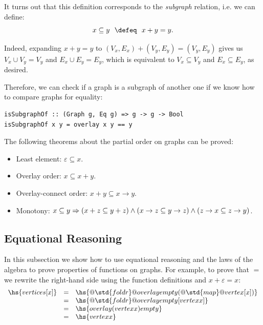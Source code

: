 \noindent
It turns out that this definition corresponds to the \emph{subgraph} relation,
i.e. we can define:
\[
x \subseteq y~~\defeq~~x + y = y.
\]

\noindent
Indeed, expanding $x + y = y$ to $(V_x,E_x) + (V_y,E_y) = (V_y,E_y)$ gives us
$V_x \cup V_y = V_y$ and $E_x \cup E_y = E_y$, which is equivalent to
$V_x \subseteq V_y$ and $E_x \subseteq E_y$, as desired.

Therefore, we can check if a graph is a subgraph of another one if we know how to
compare graphs for equality:
\begin{verbatim}
isSubgraphOf :: (Graph g, Eq g) => g -> g -> Bool
isSubgraphOf x y = overlay x y == y
\end{verbatim}

The following theorems about the partial order on graphs can be proved:

\begin{itemize}
    \item Least element: $\varepsilon \subseteq x$.
    \item Overlay order: $x \subseteq x + y$.
    \item Overlay-connect order: $x + y \subseteq x \rightarrow y$.
    \item Monotony: $x \subseteq y \Rightarrow \\
    (x + z \subseteq y + z) \wedge(x \rightarrow z \subseteq y \rightarrow z)
    \wedge (z \rightarrow x \subseteq z \rightarrow y)$.

\end{itemize}

\subsection{Equational Reasoning}\label{sub-reasoning}

In this subsection we show how to use equational reasoning and the laws
of the algebra to prove properties of functions on graphs.
For example, to prove that  $=$  we rewrite
the right-hand side using the function definitions and $x + \varepsilon = x$:
\[
\begin{array}{rcl}
\hs{vertices [x]} & = & \hs{@\std{foldr}@ overlay empty (@\std{map}@ vertex [x])}\\
 & = & \hs{@\std{foldr}@ overlay empty [vertex x]}\\
 & = & \hs{overlay (vertex x) empty}\\
 & = & \hs{vertex x}\\
\end{array}
\]

